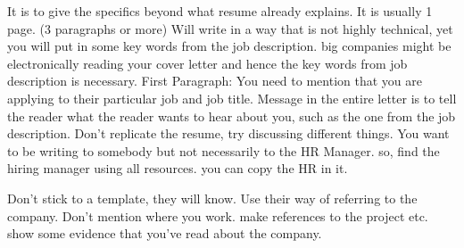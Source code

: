 It is to give the specifics beyond what resume already explains.
It is usually 1 page. (3 paragraphs or more)
Will write in a way that is not highly technical, yet you will put in some key words from the job description.
big companies might be electronically reading your cover letter and hence the key words from job description is necessary.
First Paragraph: You need to mention that you are applying to their particular job and job title.
Message in the entire letter is to tell the reader what the reader wants to hear about you, such as the one from the job description.
Don't replicate the resume, try discussing different things.
You want to be writing to somebody but not necessarily to the HR Manager. so, find the hiring manager using all resources. you can copy the HR in it.


Don't stick to a template, they will know.
Use their way of referring to the company.
Don't mention where you work.
make references to the project etc. show some evidence that you've read about the company.